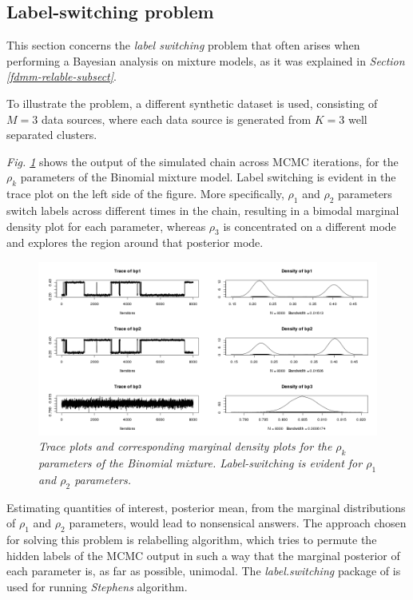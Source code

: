 \subsection{Label-switching problem} \label{integr-synth-label-sect}
This section concerns the \emph{label switching} problem that often arises when performing a Bayesian analysis on mixture models, as it was explained in \emph{Section \ref{fdmm-relable-subsect}}.

To illustrate the problem, a different synthetic dataset is used, consisting of $M=3$ data sources, where each data source is generated from $K=3$ well separated clusters. 

\emph{Fig. \ref{labelBP-pic}} shows the output of the simulated chain across MCMC iterations, for the $\rho_{k}$ parameters of the Binomial mixture model. Label switching is evident in the trace plot on the left side of the figure. More specifically, $\rho_{1}$ and $\rho_{2}$ parameters switch labels across different times in the chain, resulting in a bimodal marginal density plot for each parameter, whereas $\rho_{3}$ is concentrated on a different mode and explores the region around that posterior mode. 
\begin{figure}[!ht]
\begin{center}
 \includegraphics[scale = 0.39]{images/labelBP.png}
\caption{\emph{Trace plots and corresponding marginal density plots for the $\rho_{k}$ parameters of the Binomial mixture. Label-switching is evident for $\rho_{1}$ and $\rho_{2}$ parameters.}}
\label{labelBP-pic}
\end{center}
\end{figure}

Estimating quantities of interest, \eg posterior mean, from the marginal distributions of $\rho_{1}$ and $\rho_{2}$ parameters, would lead to nonsensical answers. The approach chosen for solving this problem is \citet{Stephens2000} relabelling algorithm, which tries to permute the hidden labels of the MCMC output in such a way that the marginal posterior of each parameter is, as far as possible, unimodal. The \emph{label.switching} package of \citet{Papastamoulis2015} is used for running \emph{Stephens} algorithm. 

